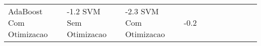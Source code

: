 \begin{table}[H]
\begin{adjustwidth}{ -1in }{ -1in }
\begin{tabular}{lllllllllll}
           AdaBoost Com Otimizacao &      -1.2%
                SVM Sem Otimizacao &      -2.3%
                SVM Com Otimizacao &      -0.2%
\bottomrule
\end{tabular}
    \end{adjustwidth}
    \renewcommand{\arraystretch}{1.0} %
\end{table}
